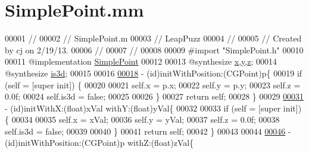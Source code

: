 \hypertarget{_simple_point_8mm}{\section{Simple\-Point.\-mm}
\label{d1/d15/_simple_point_8mm}
}

\begin{DoxyCode}
00001 \textcolor{comment}{//}
00002 \textcolor{comment}{//  SimplePoint.m}
00003 \textcolor{comment}{//  LeapPuzz}
00004 \textcolor{comment}{//}
00005 \textcolor{comment}{//  Created by cj on 2/19/13.}
00006 \textcolor{comment}{//}
00007 \textcolor{comment}{//}
00008 
00009 \textcolor{preprocessor}{#import "SimplePoint.h"}
00010 
00011 \textcolor{keyword}{@implementation }\hyperlink{interface_simple_point}{SimplePoint}
00012 
00013 \textcolor{keyword}{@synthesize} \hyperlink{interface_simple_point_abb16aaf6215e9e946606b30199b1c3af}{x},\hyperlink{interface_simple_point_ae10ba2c5156e6061258a0720443cd1c8}{y},\hyperlink{interface_simple_point_ad74ae8e5d653579e791c040155e7d4d6}{z};
00014 \textcolor{keyword}{@synthesize} \hyperlink{interface_simple_point_ad56fae41f389d3c12b4023c3e797f452}{is3d};
00015 
00016 
\hypertarget{_simple_point_8mm_source_l00018}{}\hyperlink{interface_simple_point_aa138ca80c0a7a5fa1684c38483042a76}{00018} - (id)initWithPosition:(CGPoint)p\{
00019     \textcolor{keywordflow}{if} (\textcolor{keyword}{self} = [super init]) \{
00020 
00021         \textcolor{keyword}{self}.x = p.x;
00022         \textcolor{keyword}{self}.y = p.y;
00023         \textcolor{keyword}{self}.z = 0.0f;
00024         \textcolor{keyword}{self}.is3d = \textcolor{keyword}{false};
00025         
00026     \}
00027     \textcolor{keywordflow}{return} \textcolor{keyword}{self};
00028 \}
00029 
\hypertarget{_simple_point_8mm_source_l00031}{}\hyperlink{interface_simple_point_a9ded444176a17c3ff2c398c17e6c7c74}{00031} - (id)initWithX:(\textcolor{keywordtype}{float})xVal withY:(\textcolor{keywordtype}{float})yVal\{
00032     
00033     \textcolor{keywordflow}{if} (\textcolor{keyword}{self} = [super init]) \{
00034         
00035         \textcolor{keyword}{self}.x = xVal;
00036         \textcolor{keyword}{self}.y = yVal;
00037         \textcolor{keyword}{self}.z = 0.0f;
00038         \textcolor{keyword}{self}.is3d = \textcolor{keyword}{false};
00039         
00040     \}
00041     \textcolor{keywordflow}{return} \textcolor{keyword}{self};
00042 \}
00043 
00044 
\hypertarget{_simple_point_8mm_source_l00046}{}\hyperlink{interface_simple_point_a24776a0473601bcdf437ba02dbc89d5c}{00046} - (id)initWithPosition:(CGPoint)p withZ:(\textcolor{keywordtype}{float})zVal\{

\end{DoxyCode}

